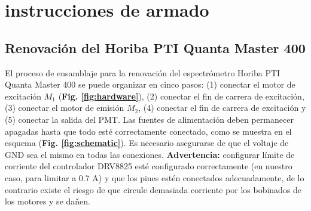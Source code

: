 
\renewcommand{\thesection}{\Alph{section}}
\renewcommand{\thefigure}{A\arabic{figure}}
\renewcommand{\tablename}{Tabla}
\renewcommand{\thetable}{A\arabic{table}}

\section{instrucciones de armado} \label{apendice:instrucciones_armado}

\subsection{Renovación del Horiba PTI Quanta Master 400} \label{subsec:refur-instructions}

El proceso de ensamblaje para la renovación del espectrómetro Horiba PTI Quanta Master 400 se puede organizar en cinco pasos: (1) conectar el motor de excitación $M_1$ (\textbf{Fig. \ref{fig:hardware}}), (2) conectar el fin de carrera de excitación, (3) conectar el motor de emisión $M_2$, (4) conectar el fin de carrera de excitación y (5) conectar la salida del PMT. 
Las fuentes de alimentación deben permanecer apagadas hasta que todo esté correctamente conectado, como se muestra en el esquema (\textbf{Fig. \ref{fig:schematic}}). 
Es necesario asegurarse de que el voltaje de GND sea el mismo en todas las conexiones. 
\textbf{Advertencia:} configurar límite de corriente del controlador DRV8825 esté configurado correctamente (en nuestro caso, para limitar a 0.7 A) y que los pines estén conectados adecuadamente, de lo contrario existe el riesgo de que circule demasiada corriente por los bobinados de los motores y se dañen.

